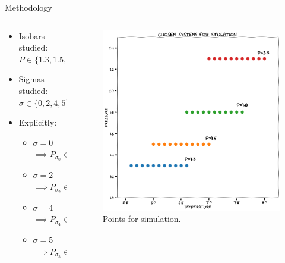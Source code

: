 \documentclass{beamer}
\begin{document}
\begin{frame}{Methodology}
    \begin{columns}
        \begin{column}{0.5\textwidth}
        \begin{itemize}
            \item Isobars studied: $P \in \{1.3, 1.5, 1.8, 2.3\}$
            \item Sigmas studied: $\sigma \in \{0, 2, 4, 5\}$
            \item Explicitly:
                \begin{itemize}
                    \item $\sigma = 0$ $\implies P_{\sigma_0} \in \{1.3, 1.5, 1.8, 2.3\}$
                    \item $\sigma = 2$ $\implies P_{\sigma_2} \in \{1.3, 1.5, 1.8, 2.3\}$
                    \item $\sigma = 4$ $\implies P_{\sigma_4} \in \{1.3, 1.5, 1.8, 2.3\}$
                    \item $\sigma = 5$ $\implies P_{\sigma_5} \in \{1.3, 1.5, 1.8, 2.3\}$
                \end{itemize}
        \end{itemize}
        
        \end{column}

        \begin{column}{0.6\textwidth}
            \begin{figure}
        \centering
        \includegraphics[scale=0.22
]{Figures/Simulated_Systems.png}
        \caption{{\scriptsize Points for simulation.}}
        \label{fig:enter-label}
    \end{figure}
        \end{column}
    \end{columns}
\end{frame}
\end{document}
